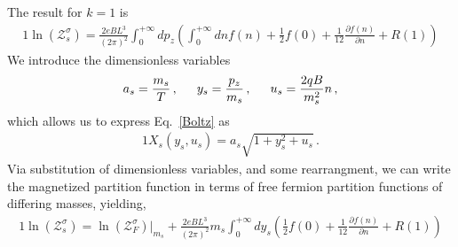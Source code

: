 \documentclass[
aps,
pra,
showpacs,
preprintnumbers,
amsmath,
amssymb,
footinbib
]{revtex4-2}
\newcommand*{\req}[1]{Eq.~{\eqref{#1}}}
\begin{document}
The result for $k=1$ is
\begin{alignat}{1}
    \label{PartFuncTwo} \ln\left(\mathcal{Z}_{s}^{\sigma}\right)=\frac{2eBL^{3}}{(2\pi)^{2}}\int_{0}^{+\infty}dp_{z}\left(\int_{0}^{+\infty}dn f(n) + \frac{1}{2}f(0) + \frac{1}{12}\frac{\partial f(n)}{\partial n} + R(1)\right)
\end{alignat}
We introduce the dimensionless variables
\begin{alignat}{1}
    \label{Unitless} a_{s}=\frac{m_{s}}{T}\,,\indent y_{s}=\frac{p_{z}}{m_{s}}\,,\indent u_{s}=\frac{2qB}{m_{s}^{2}}n\,,
\end{alignat}
which allows us to express \req{Boltz} as
\begin{alignat}{1}
    \label{UnitlessBoltz} X_{s}(y_{s},u_{s})=a_{s}\sqrt{1+y_{s}^{2}+u_{s}}\,.
\end{alignat}
Via substitution of dimensionless variables, and some rearrangment, we can write the magnetized partition function in terms of free fermion partition functions of differing masses, yielding,
\begin{alignat}{1}
    \label{Equality} \ln\left(\mathcal{Z}^{\sigma}_{s}\right) = \ln\left(\mathcal{Z}^{\sigma}_{F}\right)|_{m_{s}} + \frac{2eBL^{3}}{(2\pi)^{2}}m_{s}\int_{0}^{+\infty}dy_{s}\left(\frac{1}{2}f(0) + \frac{1}{12}\frac{\partial f(n)}{\partial n} + R(1)\right)
\end{alignat}
\end{document}
